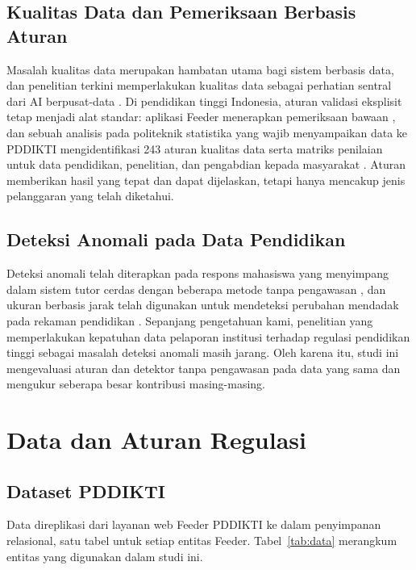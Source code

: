 \documentclass[conference]{IEEEtran}
\begin{document}
\subsection{Kualitas Data dan Pemeriksaan Berbasis Aturan}
Masalah kualitas data merupakan hambatan utama bagi sistem berbasis data, dan penelitian terkini memperlakukan kualitas data sebagai perhatian sentral dari AI berpusat-data \cite{whang2023dataquality,zha2025dcai}. Di pendidikan tinggi Indonesia, aturan validasi eksplisit tetap menjadi alat standar: aplikasi Feeder menerapkan pemeriksaan bawaan \cite{feeder_guide}, dan sebuah analisis pada politeknik statistika yang wajib menyampaikan data ke PDDIKTI mengidentifikasi 243 aturan kualitas data serta matriks penilaian untuk data pendidikan, penelitian, dan pengabdian kepada masyarakat \cite{sumadi2021dq}. Aturan memberikan hasil yang tepat dan dapat dijelaskan, tetapi hanya mencakup jenis pelanggaran yang telah diketahui.

\subsection{Deteksi Anomali pada Data Pendidikan}
Deteksi anomali telah diterapkan pada respons mahasiswa yang menyimpang dalam sistem tutor cerdas dengan beberapa metode tanpa pengawasan \cite{gorgun2022aberrant}, dan ukuran berbasis jarak telah digunakan untuk mendeteksi perubahan mendadak pada rekaman pendidikan \cite{smith2021event}. Sepanjang pengetahuan kami, penelitian yang memperlakukan kepatuhan data pelaporan institusi terhadap regulasi pendidikan tinggi sebagai masalah deteksi anomali masih jarang. Oleh karena itu, studi ini mengevaluasi aturan dan detektor tanpa pengawasan pada data yang sama dan mengukur seberapa besar kontribusi masing-masing.

\section{Data dan Aturan Regulasi}\label{sec:data}
\subsection{Dataset PDDIKTI}
Data direplikasi dari layanan web Feeder PDDIKTI ke dalam penyimpanan relasional, satu tabel untuk setiap entitas Feeder. Tabel~\ref{tab:data} merangkum entitas yang digunakan dalam studi ini.
\end{document}
